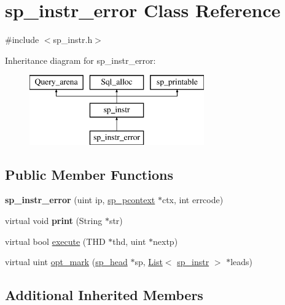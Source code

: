 \hypertarget{classsp__instr__error}{}\section{sp\+\_\+instr\+\_\+error Class Reference}
\label{classsp__instr__error}


{\ttfamily \#include $<$sp\+\_\+instr.\+h$>$}

Inheritance diagram for sp\+\_\+instr\+\_\+error\+:\begin{figure}[H]
\begin{center}
\leavevmode
\includegraphics[height=3.000000cm]{classsp__instr__error}
\end{center}
\end{figure}
\subsection*{Public Member Functions}
\begin{DoxyCompactItemize}
\item 
\mbox{\label{classsp__instr__error_a64fdcf7e0b0d5cba6df86b7e7b5593c0}} 
{\bfseries sp\+\_\+instr\+\_\+error} (uint ip, \mbox{\hyperlink{classsp__pcontext}{sp\+\_\+pcontext}} $\ast$ctx, int errcode)
\item 
\mbox{\label{classsp__instr__error_a1bd1c4ad6b803599501cf19c1ea679a7}} 
virtual void {\bfseries print} (String $\ast$str)
\item 
virtual bool \mbox{\hyperlink{classsp__instr__error_a62783095595470174aa88d3499d58bea}{execute}} (T\+HD $\ast$thd, uint $\ast$nextp)
\item 
virtual uint \mbox{\hyperlink{classsp__instr__error_ac36f346ce3637910ebab73e2e9fa9cf4}{opt\+\_\+mark}} (\mbox{\hyperlink{classsp__head}{sp\+\_\+head}} $\ast$sp, \mbox{\hyperlink{classList}{List}}$<$ \mbox{\hyperlink{classsp__instr}{sp\+\_\+instr}} $>$ $\ast$leads)
\end{DoxyCompactItemize}
\subsection*{Additional Inherited Members}


